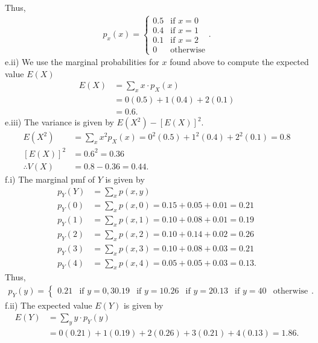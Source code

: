 \documentclass{report}
\begin{document}
\bigbreak \noindent 
Thus,
\begin{align*}
    p_{x}(x) = 
    \begin{cases}
        0.5 & \text{if } x=0 \\    
        0.4 & \text{if } x=1 \\    
        0.1 & \text{if } x=2 \\    
        0 & \text{otherwise}
    \end{cases}
.\end{align*}
\bigbreak \noindent 
e.ii) We use the marginal probabilities for $x$ found above to compute the expected value $E(X)$
\begin{align*}
    E(X) &= \sum_{x} x \cdot p_{X}(x) \\
    &=0(0.5) + 1(0.4) + 2(0.1) \\
    &=0.6
.\end{align*}
\bigbreak \noindent 
e.iii) The variance is given by $E(X^{2}) - \left[E(X)\right]^{2} $. 
\begin{align*}
    E(X^{2}) &= \sum_{x} x^{2}p_{X}(x) = 0^{2}(0.5) + 1^{2}(0.4) + 2^{2}(0.1) = 0.8 \\
    \left[E(X)\right]^{2} &= 0.6^{2} = 0.36 \\
    \therefore V(X) &= 0.8 - 0.36 = 0.44
.\end{align*}
\bigbreak \noindent 
f.i) The marginal pmf of $Y$ is given by
\begin{align*}
    p_{Y}(Y) &= \sum_x p(x,y) \\
    p_{Y}(0) &= \sum_{x} p(x,0) = 0.15 + 0.05 + 0.01 = 0.21 \\
    p_{Y}(1) &= \sum_{x} p(x,1) = 0.10 + 0.08 + 0.01 = 0.19  \\
    p_{Y}(2) &= \sum_{x} p(x,2) = 0.10 + 0.14 + 0.02 = 0.26 \\
    p_{Y}(3) &= \sum_{x} p(x,3) =  0.10 + 0.08 + 0.03 = 0.21 \\
    p_{Y}(4) &= \sum_{x} p(x,4) = 0.05 + 0.05 + 0.03 = 0.13
.\end{align*}
\bigbreak \noindent 
Thus,
\begin{align*}
    p_{Y}(y) =
    \begin{cases}
        0.21 & \text{if } y=0,3     
        0.19 & \text{if } y=1
        0.26 & \text{if } y=2
        0.13 & \text{if } y=4
        0 & \text{otherwise}
    \end{cases}
.\end{align*}
\bigbreak \noindent 
f.ii) The expected value $E(Y)$ is given by
\begin{align*}
    E(Y) &= \sum_{y} y \cdot p_{Y}(y) \\
    &=0(0.21) + 1(0.19) + 2(0.26) + 3(0.21) + 4(0.13) = 1.86
.\end{align*}
\end{document}

